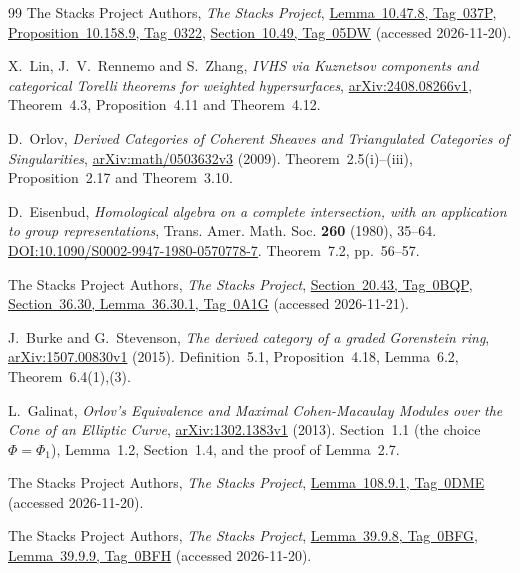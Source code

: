 \begin{thebibliography}{99}
The Stacks Project Authors,
\emph{The Stacks Project},
\href{https://stacks.math.columbia.edu/tag/037P}{Lemma~10.47.8, Tag~037P},
\href{https://stacks.math.columbia.edu/tag/0322}{Proposition~10.158.9, Tag~0322},
\href{https://stacks.math.columbia.edu/tag/05DW}{Section~10.49, Tag~05DW}
(accessed 2026-11-20).

 X.~Lin, J.~V.~Rennemo and S.~Zhang,
\emph{IVHS via Kuznetsov components and categorical Torelli theorems for weighted hypersurfaces},
\href{https://arxiv.org/abs/2408.08266v1}{arXiv:2408.08266v1},
Theorem~4.3, Proposition~4.11 and Theorem~4.12.

D.~Orlov,
\emph{Derived Categories of Coherent Sheaves and Triangulated Categories of Singularities},
\href{https://arxiv.org/abs/math/0503632v3}{arXiv:math/0503632v3} (2009).
Theorem~2.5(i)--(iii), Proposition~2.17 and Theorem~3.10.

D.~Eisenbud,
\emph{Homological algebra on a complete intersection, with an application to group representations},
Trans. Amer. Math. Soc. \textbf{260} (1980), 35--64.
\href{https://doi.org/10.1090/S0002-9947-1980-0570778-7}{DOI:10.1090/S0002-9947-1980-0570778-7}.
Theorem~7.2, pp.~56--57.

The Stacks Project Authors,
\emph{The Stacks Project},
\href{https://stacks.math.columbia.edu/tag/0BQP}{Section~20.43, Tag~0BQP},
\href{https://stacks.math.columbia.edu/tag/0A1G}{Section~36.30, Lemma~36.30.1, Tag~0A1G}
(accessed 2026-11-21).

J.~Burke and G.~Stevenson,
\emph{The derived category of a graded Gorenstein ring},
\href{https://arxiv.org/abs/1507.00830v1}{arXiv:1507.00830v1} (2015).
Definition~5.1, Proposition~4.18, Lemma~6.2, Theorem~6.4(1),(3).

L.~Galinat,
\emph{Orlov's Equivalence and Maximal Cohen-Macaulay Modules over the Cone of an Elliptic Curve},
\href{https://arxiv.org/abs/1302.1383v1}{arXiv:1302.1383v1} (2013).
Section~1.1 (the choice $\Phi=\Phi_1$), Lemma~1.2, Section~1.4,
and the proof of Lemma~2.7.

The Stacks Project Authors,
\emph{The Stacks Project},
\href{https://stacks.math.columbia.edu/tag/0DME}{Lemma~108.9.1, Tag~0DME}
(accessed 2026-11-20).

The Stacks Project Authors,
\emph{The Stacks Project},
\href{https://stacks.math.columbia.edu/tag/0BFG}{Lemma~39.9.8, Tag~0BFG},
\href{https://stacks.math.columbia.edu/tag/0BFH}{Lemma~39.9.9, Tag~0BFH}
(accessed 2026-11-20).


\end{thebibliography}
